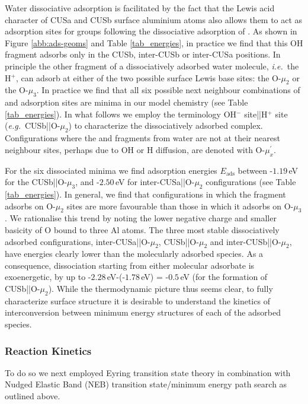 \documentclass[twoside,twocolumn,9pt]{article}
\begin{document}
Water dissociative adsorption is facilitated by the fact that the Lewis acid character of CUSa and CUSb surface aluminium atoms also allows them to act as adsorption sites for  groups following the dissociative adsorption of . As shown in Figure \ref{abb:ads-geoms} and Table \ref{tab_energies}, in practice we find that this OH fragment adsorbs only in the CUSb, inter-CUSb or inter-CUSa positions. In principle the other fragment of a dissociatively adsorbed water molecule, \textit{i.e.}\ the H$^{+}$, can adsorb at either of the two possible surface Lewis base sites: the O-$\mu_2$ or the O-$\mu_3$. In practice we find that all six possible next neighbour combinations of  and  adsorption sites are minima in our model chemistry (see Table \ref{tab_energies}). In what follows we employ the terminology \textsf{OH$^{-}$ site}||\textsf{H$^{+}$ site} (\textit{e.g.}\ CUSb||O-$\mu_2$) to characterize the dissociatively adsorbed complex. Configurations where the  and  fragments from water are not at their nearest neighbour sites, perhaps due to OH or H diffusion, are denoted with O-$\mu_x^\prime$.

For the six dissociated minima we find adsorption energies $E_\text{ads}$ between -$1.19\,$eV for the CUSb||O-$\mu_3$, and -$2.50\,$eV for inter-CUSa||O-$\mu_2$ configurations (see Table \ref{tab_energies}). In general, we find that configurations in which the  fragment adsorbs on O-$\mu_2$ sites are more favourable than those in which it adsorbs on O-$\mu_3$. We rationalise this trend by noting the lower negative charge and smaller basicity of O bound to three Al atoms. The three most stable dissociatively adsorbed configurations, inter-CUSa||O-$\mu_2$, CUSb||O-$\mu_2$ and inter-CUSb||O-$\mu_2$, have energies clearly lower than the molecularly adsorbed species. As a consequence, dissociation starting from either molecular adsorbate is exoenergetic, by up to -$2.28\,$eV-(-$1.78\,$eV) = -$0.5\,$eV (for the formation of CUSb||O-$\mu_2$). While the thermodynamic picture thus seems clear, to fully characterize surface structure it is desirable to understand the kinetics of interconversion between minimum energy structures 
of each of the adsorbed species.
 
  
\subsubsection{Reaction Kinetics}
To do so we next employed Eyring transition state theory in combination with Nudged Elastic Band (NEB) transition state/minimum energy path search as outlined above. 
\end{document}

